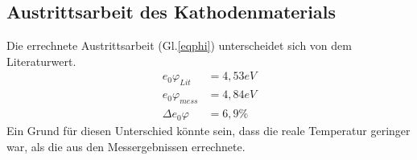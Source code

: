 \subsection{Austrittsarbeit des Kathodenmaterials}
Die errechnete Austrittsarbeit (Gl.\ref{eqphi}) unterscheidet sich von dem Literaturwert\cite{tafel}.
\begin{align}
	e_0\varphi_{Lit}&=4{,}53eV \\
	e_0\varphi_{mess}&=4{,}84eV\\
	\Delta e_0\varphi&=6,9\%
 \end{align}
 Ein Grund für diesen Unterschied könnte sein, dass die reale Temperatur geringer war, als die aus den Messergebnissen errechnete.
 
